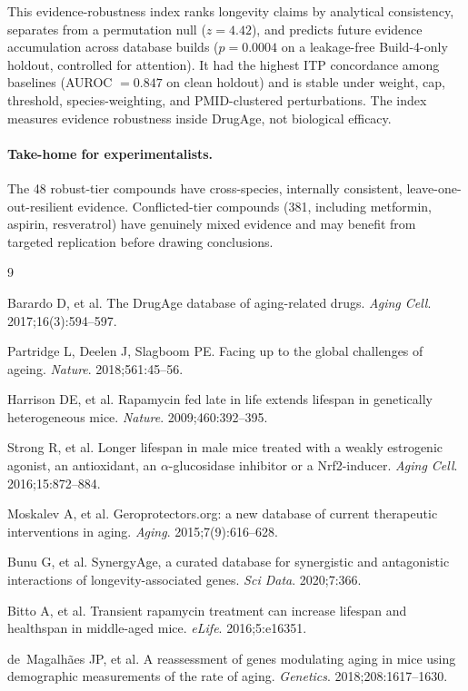 \documentclass[10pt]{article}
\begin{document}
This evidence-robustness index ranks longevity claims by analytical consistency, separates from a permutation null ($z = 4.42$), and predicts future evidence accumulation across database builds ($p = 0.0004$ on a leakage-free Build-4-only holdout, controlled for attention). It had the highest ITP concordance among baselines (AUROC $= 0.847$ on clean holdout) and is stable under weight, cap, threshold, species-weighting, and PMID-clustered perturbations. The index measures evidence robustness inside DrugAge, not biological efficacy.

\paragraph{Take-home for experimentalists.} The 48 robust-tier compounds have cross-species, internally consistent, leave-one-out-resilient evidence. Conflicted-tier compounds (381, including metformin, aspirin, resveratrol) have genuinely mixed evidence and may benefit from targeted replication before drawing conclusions.

{\footnotesize
\begin{thebibliography}{9}
\setlength{\itemsep}{0pt}\setlength{\parskip}{0pt}

Barardo D, et al.
The DrugAge database of aging-related drugs.
\textit{Aging Cell}. 2017;16(3):594--597.

Partridge L, Deelen J, Slagboom PE.
Facing up to the global challenges of ageing.
\textit{Nature}. 2018;561:45--56.

Harrison DE, et al.
Rapamycin fed late in life extends lifespan in genetically heterogeneous mice.
\textit{Nature}. 2009;460:392--395.

Strong R, et al.
Longer lifespan in male mice treated with a weakly estrogenic agonist, an antioxidant, an $\alpha$-glucosidase inhibitor or a Nrf2-inducer.
\textit{Aging Cell}. 2016;15:872--884.

Moskalev A, et al.
Geroprotectors.org: a new database of current therapeutic interventions in aging.
\textit{Aging}. 2015;7(9):616--628.

Bunu G, et al.
SynergyAge, a curated database for synergistic and antagonistic interactions of longevity-associated genes.
\textit{Sci Data}. 2020;7:366.

Bitto A, et al.
Transient rapamycin treatment can increase lifespan and healthspan in middle-aged mice.
\textit{eLife}. 2016;5:e16351.

de~Magalh\~aes JP, et al.
A reassessment of genes modulating aging in mice using demographic measurements of the rate of aging.
\textit{Genetics}. 2018;208:1617--1630.

\end{thebibliography}
}
\end{document}
